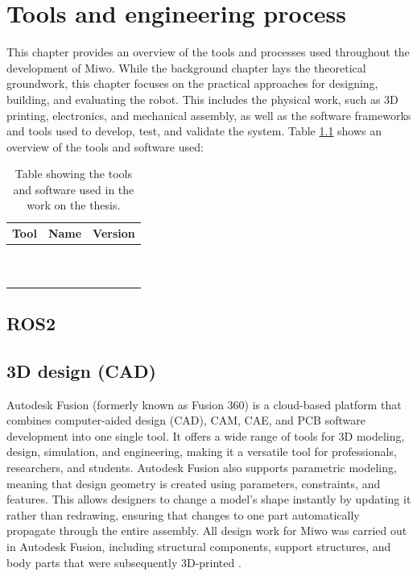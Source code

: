 \chapter{Tools and engineering process}
This chapter provides an overview of the tools and processes used throughout the development of Miwo. While the background chapter lays the theoretical groundwork, this chapter focuses on the practical approaches for designing, building, and evaluating the robot. This includes the physical work, such as 3D printing, electronics, and mechanical assembly, as well as the software frameworks and tools used to develop, test, and validate the system.
Table \ref{tab:tools} shows an overview of the tools and software used:

\begin{table}[h]
    \centering
    \begin{tabular}{|l|l|l|}
        \hline
        \textbf{Tool} & \textbf{Name}& \textbf{Version} \\
        \hline
        & & \\[1em]
        \hline
        & & \\[1em]
        \hline
        & & \\[1em]
        \hline
        & & \\[1em]
        \hline
        & & \\[1em]
        \hline
        & & \\[1em]
        \hline
        & & \\[1em]
        \hline
        & & \\[1em]
        \hline
        & & \\[1em]
        \hline
        & & \\[1em]
        \hline
    \end{tabular}
    \caption{Table showing the tools and software used in the work on the thesis.}
    \label{tab:tools}
\end{table}

\newpage
\section*{ROS2}

\section*{3D design (CAD)}
Autodesk Fusion (formerly known as Fusion 360) is a cloud-based platform that combines computer-aided design (CAD), CAM, CAE, and PCB software development into one single tool. It offers a wide range of tools for 3D modeling, design, simulation, and engineering, making it a versatile tool for professionals, researchers, and students. Autodesk Fusion also supports parametric modeling, meaning that design geometry is created using parameters, constraints, and features. This allows designers to change a model's shape instantly by updating it rather than redrawing, ensuring that changes to one part automatically propagate through the entire assembly. All design work for Miwo was carried out in Autodesk Fusion, including structural components, support structures, and body parts that were subsequently 3D-printed \cite {noauthor_what_nodate}.

